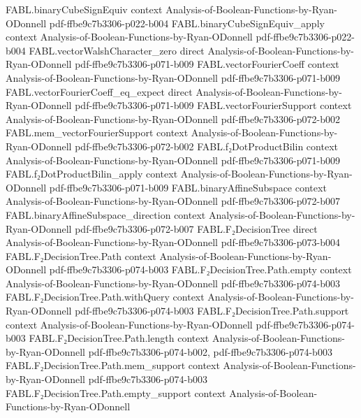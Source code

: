 \begin{theorem}
  {FABL.binaryCubeSignEquiv}
  {context}
  {Analysis-of-Boolean-Functions-by-Ryan-ODonnell}
  {pdf-ffbe9c7b3306-p022-b004}
\proofstep
  {FABL.binaryCubeSignEquiv_apply}
  {context}
  {Analysis-of-Boolean-Functions-by-Ryan-ODonnell}
  {pdf-ffbe9c7b3306-p022-b004}
\proofstep
  {FABL.vectorWalshCharacter_zero}
  {direct}
  {Analysis-of-Boolean-Functions-by-Ryan-ODonnell}
  {pdf-ffbe9c7b3306-p071-b009}
\proofstep
  {FABL.vectorFourierCoeff}
  {context}
  {Analysis-of-Boolean-Functions-by-Ryan-ODonnell}
  {pdf-ffbe9c7b3306-p071-b009}
\proofstep
  {FABL.vectorFourierCoeff_eq_expect}
  {direct}
  {Analysis-of-Boolean-Functions-by-Ryan-ODonnell}
  {pdf-ffbe9c7b3306-p071-b009}
\proofstep
  {FABL.vectorFourierSupport}
  {context}
  {Analysis-of-Boolean-Functions-by-Ryan-ODonnell}
  {pdf-ffbe9c7b3306-p072-b002}
\proofstep
  {FABL.mem_vectorFourierSupport}
  {context}
  {Analysis-of-Boolean-Functions-by-Ryan-ODonnell}
  {pdf-ffbe9c7b3306-p072-b002}
\proofstep
  {FABL.f₂DotProductBilin}
  {context}
  {Analysis-of-Boolean-Functions-by-Ryan-ODonnell}
  {pdf-ffbe9c7b3306-p071-b009}
\proofstep
  {FABL.f₂DotProductBilin_apply}
  {context}
  {Analysis-of-Boolean-Functions-by-Ryan-ODonnell}
  {pdf-ffbe9c7b3306-p071-b009}
\proofstep
  {FABL.binaryAffineSubspace}
  {context}
  {Analysis-of-Boolean-Functions-by-Ryan-ODonnell}
  {pdf-ffbe9c7b3306-p072-b007}
\proofstep
  {FABL.binaryAffineSubspace_direction}
  {context}
  {Analysis-of-Boolean-Functions-by-Ryan-ODonnell}
  {pdf-ffbe9c7b3306-p072-b007}
\proofstep
  {FABL.F₂DecisionTree}
  {direct}
  {Analysis-of-Boolean-Functions-by-Ryan-ODonnell}
  {pdf-ffbe9c7b3306-p073-b004}
\proofstep
  {FABL.F₂DecisionTree.Path}
  {context}
  {Analysis-of-Boolean-Functions-by-Ryan-ODonnell}
  {pdf-ffbe9c7b3306-p074-b003}
\proofstep
  {FABL.F₂DecisionTree.Path.empty}
  {context}
  {Analysis-of-Boolean-Functions-by-Ryan-ODonnell}
  {pdf-ffbe9c7b3306-p074-b003}
\proofstep
  {FABL.F₂DecisionTree.Path.withQuery}
  {context}
  {Analysis-of-Boolean-Functions-by-Ryan-ODonnell}
  {pdf-ffbe9c7b3306-p074-b003}
\proofstep
  {FABL.F₂DecisionTree.Path.support}
  {context}
  {Analysis-of-Boolean-Functions-by-Ryan-ODonnell}
  {pdf-ffbe9c7b3306-p074-b003}
\proofstep
  {FABL.F₂DecisionTree.Path.length}
  {context}
  {Analysis-of-Boolean-Functions-by-Ryan-ODonnell}
  {pdf-ffbe9c7b3306-p074-b002,
    pdf-ffbe9c7b3306-p074-b003}
\proofstep
  {FABL.F₂DecisionTree.Path.mem_support}
  {context}
  {Analysis-of-Boolean-Functions-by-Ryan-ODonnell}
  {pdf-ffbe9c7b3306-p074-b003}
\proofstep
  {FABL.F₂DecisionTree.Path.empty_support}
  {context}
  {Analysis-of-Boolean-Functions-by-Ryan-ODonnell}

\end{theorem}

